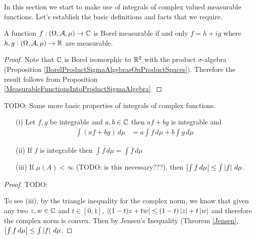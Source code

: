 In this section we start to make use of integrals of complex valued
measurable functions.  Let's establish the basic definitions and facts
that we require.
\begin{prop}\label{BorelMeasurableComplexFunctions}A function $f : (\Omega, \mathcal{A}, \mu) \to \mathbb{C}$
  is Borel measurable if and only $f = h + i g$ where $h,g : (\Omega,
  \mathcal{A}, \mu) \to \mathbb{R}$ are measurable.  
\end{prop}
\begin{proof}
Note that $\mathbb{C}$ is Borel isomorphic to $\mathbb{R}^2$ with the product
$\sigma$-algebra (Proposition \ref{BorelProductSigmaAlgebrasOnProductSpaces}).  Therefore the result follows from 
Proposition \ref{MeasurableFunctionsIntoProductSigmaAlgebra}.
\end{proof}

TODO: Some more basic properties of integrals of complex functions.
\begin{prop}\label{PropertiesOfComplexIntegrals}
\begin{itemize}
\item[(i)] Let $f, g$ be integrable and $a, b \in \mathbb{C}$ then $af
  + bg$ is integrable and 
\begin{align*}
\int (af + bg) \, d\mu &= a \int f \, d\mu + b \int g \, d\mu
\end{align*}
\item[(ii)] If $f$ is integrable then $\overline{\int f \, d\mu} = \int
  \overline{f} \, d\mu$
\item[(iii)] If $\mu(A) < \infty$ (TODO: is this necessary???), then $\left \vert \int f \, d\mu \right \vert \leq \int
  \left \vert f \right \vert \, d\mu$.
\end{itemize}
\end{prop}
\begin{proof}
TODO:

To see (iii), by the triangle inequality for the complex norm, we know that given
any two $z,w \in \mathbb{C}$ and $t \in [0,1]$, $\left \vert (1-t) z + t w \right \vert
\leq (1-t) \left \vert z \right \vert + t \left \vert w \right \vert$ and therefore the complex norm is
convex.  Then by Jensen's Inequality (Theorem \ref{Jensen}, $\left \vert \int f \, d\mu \right \vert \leq \int
\left \vert f \right \vert \, d\mu$.
\end{proof}

